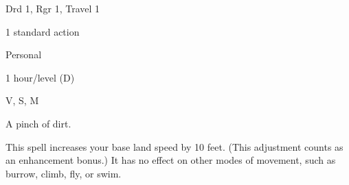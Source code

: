 
\begin{description*}
\item[Level:] Drd 1, Rgr 1, Travel 1
\item[Casting Time:] 1 standard action
\item[Range:] Personal
\item[Duration:] 1 hour/level (D)
\item[Components:] V, S, M
\item[Arcane Material Component:] A pinch of dirt.
\end{description*}

This spell increases your base land speed by 10 feet. (This adjustment counts as
an enhancement bonus.) It has no effect on other modes of movement, such as burrow,
climb, fly, or swim.